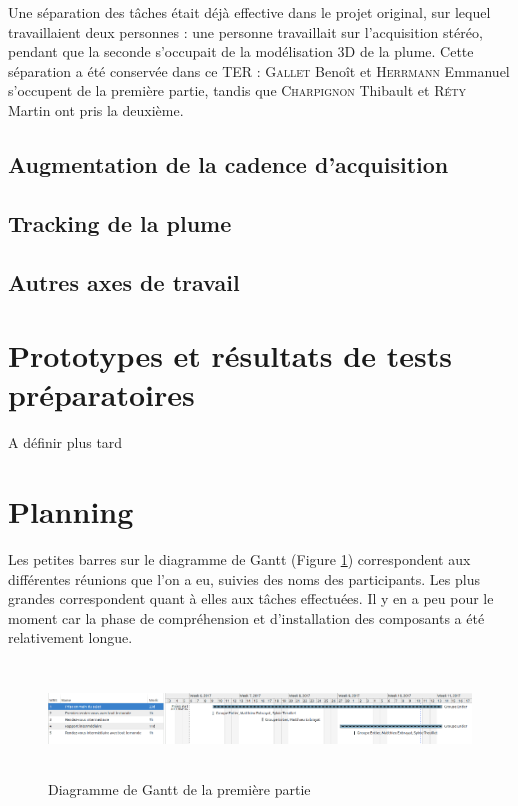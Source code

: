 \documentclass{article}
\begin{document}
	Une séparation des tâches était déjà effective dans le projet original, sur lequel travaillaient deux personnes : une personne travaillait sur l'acquisition stéréo, pendant que la seconde s'occupait de la modélisation 3D de la plume. Cette séparation a été conservée dans ce TER : \textsc{Gallet} Benoît et \textsc{Herrmann} Emmanuel s'occupent de la première partie, tandis que \textsc{Charpignon} Thibault et \textsc{Réty} Martin ont pris la deuxième.

\subsection{Augmentation de la cadence d'acquisition}



\subsection{Tracking de la plume}



\subsection{Autres axes de travail}



\section{Prototypes et résultats de tests préparatoires}
A définir plus tard

\section{Planning}

Les petites barres sur le diagramme de Gantt (Figure \ref{gantt1}) correspondent aux différentes réunions que l'on a eu, suivies des noms des participants. Les plus grandes correspondent quant à elles aux tâches effectuées. Il y en a peu pour le moment car la phase de compréhension et d'installation des composants a été relativement longue.

\begin{figure}[!h]
\centering
\includegraphics[width=\textwidth, height=3cm]{Modules/Picture/diag1.png}
\caption{Diagramme de Gantt de la première partie}
\label{gantt1}
\end{figure}

\newpage

\nocite{*}

 
 
\end{document}
